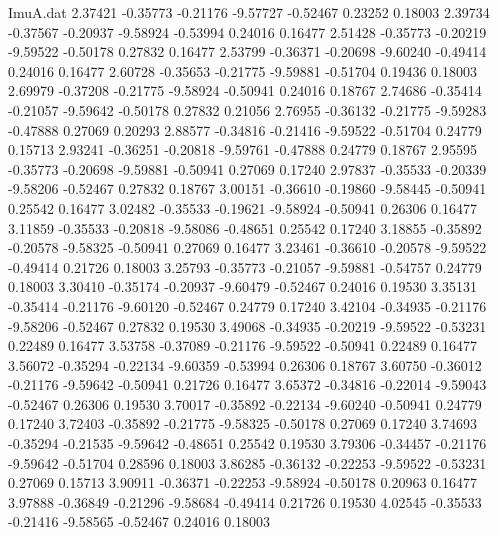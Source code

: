 \begin{filecontents}{ImuA.dat}
   2.37421   -0.35773   -0.21176   -9.57727   -0.52467    0.23252    0.18003
   2.39734   -0.37567   -0.20937   -9.58924   -0.53994    0.24016    0.16477
   2.51428   -0.35773   -0.20219   -9.59522   -0.50178    0.27832    0.16477
   2.53799   -0.36371   -0.20698   -9.60240   -0.49414    0.24016    0.16477
   2.60728   -0.35653   -0.21775   -9.59881   -0.51704    0.19436    0.18003
   2.69979   -0.37208   -0.21775   -9.58924   -0.50941    0.24016    0.18767
   2.74686   -0.35414   -0.21057   -9.59642   -0.50178    0.27832    0.21056
   2.76955   -0.36132   -0.21775   -9.59283   -0.47888    0.27069    0.20293
   2.88577   -0.34816   -0.21416   -9.59522   -0.51704    0.24779    0.15713
   2.93241   -0.36251   -0.20818   -9.59761   -0.47888    0.24779    0.18767
   2.95595   -0.35773   -0.20698   -9.59881   -0.50941    0.27069    0.17240
   2.97837   -0.35533   -0.20339   -9.58206   -0.52467    0.27832    0.18767
   3.00151   -0.36610   -0.19860   -9.58445   -0.50941    0.25542    0.16477
   3.02482   -0.35533   -0.19621   -9.58924   -0.50941    0.26306    0.16477
   3.11859   -0.35533   -0.20818   -9.58086   -0.48651    0.25542    0.17240
   3.18855   -0.35892   -0.20578   -9.58325   -0.50941    0.27069    0.16477
   3.23461   -0.36610   -0.20578   -9.59522   -0.49414    0.21726    0.18003
   3.25793   -0.35773   -0.21057   -9.59881   -0.54757    0.24779    0.18003
   3.30410   -0.35174   -0.20937   -9.60479   -0.52467    0.24016    0.19530
   3.35131   -0.35414   -0.21176   -9.60120   -0.52467    0.24779    0.17240
   3.42104   -0.34935   -0.21176   -9.58206   -0.52467    0.27832    0.19530
   3.49068   -0.34935   -0.20219   -9.59522   -0.53231    0.22489    0.16477
   3.53758   -0.37089   -0.21176   -9.59522   -0.50941    0.22489    0.16477
   3.56072   -0.35294   -0.22134   -9.60359   -0.53994    0.26306    0.18767
   3.60750   -0.36012   -0.21176   -9.59642   -0.50941    0.21726    0.16477
   3.65372   -0.34816   -0.22014   -9.59043   -0.52467    0.26306    0.19530
   3.70017   -0.35892   -0.22134   -9.60240   -0.50941    0.24779    0.17240
   3.72403   -0.35892   -0.21775   -9.58325   -0.50178    0.27069    0.17240
   3.74693   -0.35294   -0.21535   -9.59642   -0.48651    0.25542    0.19530
   3.79306   -0.34457   -0.21176   -9.59642   -0.51704    0.28596    0.18003
   3.86285   -0.36132   -0.22253   -9.59522   -0.53231    0.27069    0.15713
   3.90911   -0.36371   -0.22253   -9.58924   -0.50178    0.20963    0.16477
   3.97888   -0.36849   -0.21296   -9.58684   -0.49414    0.21726    0.19530
   4.02545   -0.35533   -0.21416   -9.58565   -0.52467    0.24016    0.18003

\end{filecontents}
